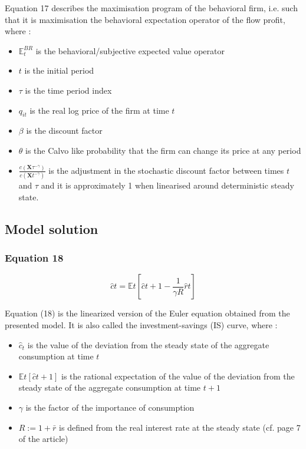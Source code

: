 \documentclass{article}
\begin{document}
Equation 17 describes the maximisation program of the behavioral firm, i.e. such that it is maximisation the behavioral expectation operator of the flow profit, where : 
\begin{itemize}
    \item $\mathbb{E}_{t}^{BR}$ is the behavioral/subjective expected value operator 
    \item $t$ is the initial period 
    \item $\tau$ is the time period index  
    \item $q_{it}$ is the real log price of the firm at time $t$
    \item $\beta$ is the discount factor
    \item $\theta$ is the Calvo like probability that the firm can change its price at any period
    \item $\frac{c\left(\bm{X}{\tau}^{-\gamma}\right)}{c\left(\bm{X}{t}^{-\gamma}\right)}$ is the adjustment in the stochastic discount factor between times $t$ and $\tau$ and it is approximately 1 when linearised around deterministic steady state. 
\end{itemize}

\subsection{Model solution}

\subsubsection*{Equation 18}
\begin{equation}
    \hat{c}{t}=\mathbb{E}{t}\left[\hat{c}{t+1}-\frac{1}{\gamma R}\hat{r}{t}\right]
\end{equation}

Equation (18) is the linearized version of the Euler equation obtained from the presented model. It is also called the investment-savings (IS) curve, where : 
\begin{itemize}
    \item $\hat{c}_{t}$ is the value of the deviation from the steady state of the aggregate consumption at time $t$
    \item $\mathbb{E}{t}\left[\hat{c}{t+1}\right]$ is the rational expectation of the value of the deviation from the steady state of the aggregate consumption at time $t+1$
    \item $\gamma$ is the factor of the importance of consumption
    \item $R:=1+\bar{r}$ is defined from the real interest rate at the steady state (cf. page 7 of the article)
\end{itemize}
\end{document}
